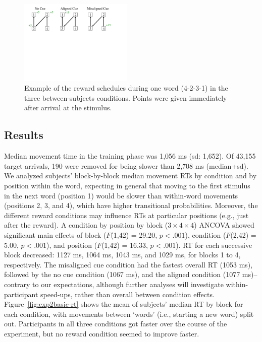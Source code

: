 \documentclass[conference]{IEEEtran}
\begin{document}
\begin{figure}[h]
  \centering
  \includegraphics[width=0.48\textwidth]{figures/exp2_conditions}
  \caption{Example of the reward schedules during one word (4-2-3-1) in the three between-subjects conditions. Points were given immediately after arrival at the stimulus.}
  \label{fig:exp2conds}
\end{figure} 

\subsection{Results}

Median movement time in the training phase was 1,056 ms (sd: 1,652). Of 43,155 target arrivals, 190 were removed for being slower than 2,708 ms (median+sd). We analyzed subjects' block-by-block median movement RTs by condition and by position within the word, expecting in general that moving to the first stimulus in the next word (position 1) would be slower than within-word movements (positions 2, 3, and 4), which have higher transitional probabilities. Moreover, the different reward conditions may influence RTs at particular positions (e.g., just after the reward). A condition by position by block ($3\times4\times4$) ANCOVA showed significant main effects of block ($F$(1,42) = 29.20, $p<.001$), condition ($F$(2,42) = 5.00, $p<.001$), and position ($F$(1,42) = 16.33, $p<.001$). RT for each successive block decreased: 1127 ms, 1064 ms, 1043 ms, and 1029 ms, for blocks 1 to 4, respectively. The misaligned cue condition had the fastest overall RT (1053 ms), followed by the no cue condition (1067 ms), and the aligned condition (1077 ms)--contrary to our expectations, although further analyses will investigate within-participant speed-ups, rather than overall between condition effects. Figure~\ref{fig:exp2basic-rt} shows the mean of subjects' median RT by block for each condition, with movements between `words' (i.e., starting a new word) split out. Participants in all three conditions got faster over the course of the experiment, but no reward condition seemed to improve faster. 
\end{document}
